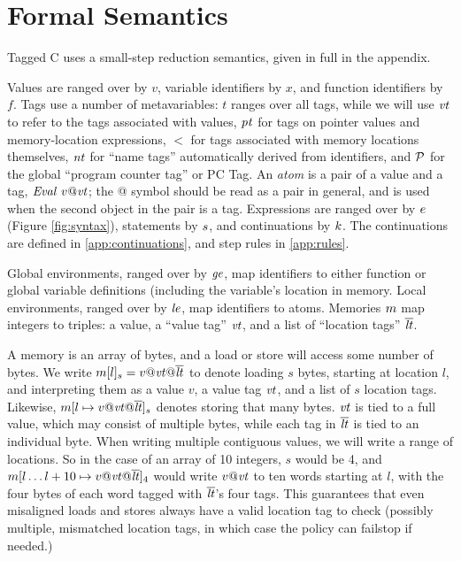 \documentclass[acmsmall,review,anonymous]{acmart}\settopmatter{printfolios=true,printccs=false,printacmref=false}
\begin{document}
\section{Formal Semantics}
\label{sec:semantics}

Tagged C uses a small-step reduction semantics, given in full in the appendix.

Values are ranged over by \(v\), variable identifiers by \(x\), and function identifiers by \(f\).
Tags use a number of metavariables: \(t\) ranges over all tags, while we will use
\(\mathit{vt}\) to refer to the tags associated with values, \(\mathit{pt}\) for tags on pointer values
and memory-location expressions, \(\lt\) for tags associated with memory locations themselves,
\(\mathit{nt}\) for ``name tags'' automatically derived from identifiers, and \(\mathcal{P}\) for the
global ``program counter tag'' or PC Tag.
An {\it atom} is a pair of a value and a tag, \(\mathit{Eval} ~ v@\mathit{vt}\); the @ symbol should be read
as a pair in general, and is used when the second object in the pair is a tag.
Expressions are ranged over by \(e\) (Figure \ref{fig:syntax}),
statements by \(s\), and continuations by \(k\).
The continuations are defined in \cref{app:continuations}, and step rules in \cref{app:rules}.

Global environments, ranged over by \(\mathit{ge}\), map identifiers to either function
or global variable definitions (including the variable's location in memory. Local environments,
ranged over by \(\mathit{le}\), map identifiers to atoms.
Memories \(m\) map integers to
triples: a value, a ``value tag'' \(\mathit{vt}\), and a list of ``location tags'' \(\overline{\mathit{lt}}\).

A memory is an array of bytes, and a load or store will access some number of bytes. We write
\(m[l]_s = v@\mathit{vt} @\overline{\mathit{lt}}\) to denote loading \(s\) bytes,
starting at location \(l\), and interpreting them as a value \(v\), a value tag \(\mathit{vt}\), and a list of
\(s\) location tags. Likewise, \(m[l \mapsto v@\mathit{vt} @ \overline{\mathit{lt}}]_s\)
denotes storing that many bytes. \(\mathit{vt}\) is tied to a full value, which may consist of
multiple bytes, while each tag in \(\overline{\mathit{lt}}\) is tied to an individual byte.
When writing multiple contiguous values, we will write a range of locations. So
in the case of an array of 10 integers, \(s\) would be 4, and
\(m[l \dots l+10 \mapsto v@\mathit{vt} @ \overline{\mathit{lt}}]_4\) would write \(v@\mathit{vt}\) to ten words starting at \(l\),
with the four bytes of each word tagged with \(\overline{\mathit{lt}}\)'s four tags.
This guarantees that even misaligned loads and stores always have a valid location tag to check
(possibly multiple, mismatched location tags, in which case the policy can failstop if needed.)
\end{document}
